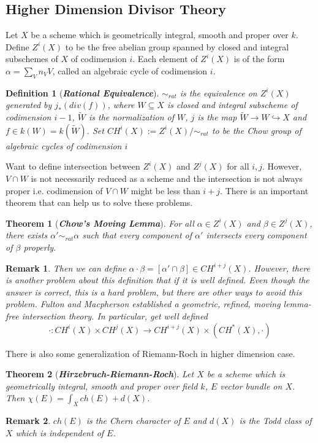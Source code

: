 \documentclass{ctexart}
\newtheorem{definition}{Definition}[section]
\newtheorem{remark}{Remark}[section]
\newtheorem{theorem}{Theorem}[section]
\begin{document}
\subsection{Higher Dimension Divisor Theory}
Let $X$ be a scheme which is geometrically integral, smooth and proper over $k$.
Define $Z^{i}(X)$ to be the free abelian group spanned by closed and integral subschemes of $X$ of codimension $i$.
Each element of $Z^{i}(X)$ is of the form $\alpha = \sum_{V} n_{V}V$, called an algebraic cycle of codimension $i$.
\begin{definition}[\textbf{\emph{Rational Equivalence}}]
    $\sim_{rat}$ is the equivalence on $Z^{i}(X)$ generated by $j_{\ast}(div(f))$,
    where $W \subseteq X$ is closed and integral subscheme of codimension $i - 1$, $\widetilde{W}$ is the normalization of $W$, 
    $j$ is the map $\widetilde{W} \longrightarrow W \hookrightarrow X$ and $f\in k(W) = k(\widetilde{W})$.
    Set $CH^{i}(X) := Z^{i}(X)/\sim_{rat}$ to be the Chow group of algebraic cycles of codimension $i$
\end{definition}
Want to define intersection between $Z^{i}(X)$ and $Z^{j}(X)$ for all $i,j$.
However, $V \cap W$ is not necessarily reduced as a scheme and the intersection is not always proper i.e. codimension of $V \cap W$ might be less than $i + j$.
There is an important theorem that can help us to solve these problems.
\begin{theorem}[\textbf{\emph{Chow's Moving Lemma}}]
    For all $\alpha\in Z^{i}(X)$ and $\beta\in Z^{j}(X)$, there exists $\alpha' \sim_{rat} \alpha$ such that every component of $\alpha'$ intersects every component of $\beta$ properly.
    \label{Theorem 8.3}
\end{theorem}
\begin{remark}
    Then we can define $\alpha \cdot \beta = [\alpha' \cap \beta]\in CH^{i + j}(X)$.
    However, there is another problem about this definition that if it is well defined.
    Even though the answer is correct, this is a hard problem, but there are other ways to avoid this problem.
    Fulton and Macpherson established a geometric, refined, moving lemma-free intersection theory.
    In particular, get well defined
    \begin{equation*}
        \cdot: CH^{i}(X) \times CH^{j}(X) \longrightarrow CH^{i + j}(X) \times (CH^{\ast}(X), \cdot)
    \end{equation*}
\end{remark}
There is also some generalization of Riemann-Roch in higher dimension case.
\begin{theorem}[\textbf{\emph{Hirzebruch-Riemann-Roch}}]
    Let $X$ be a scheme which is geometrically integral, smooth and proper over field $k$, $E$ vector bundle on $X$.
    Then $\chi(E) = \int_{X} ch(E) + d(X)$.
    \label{Theorem 8.4}
\end{theorem}
\begin{remark}
    $ch(E)$ is the Chern character of $E$ and $d(X)$ is the Todd class of $X$ which is independent of $E$.
\end{remark}
\end{document}
